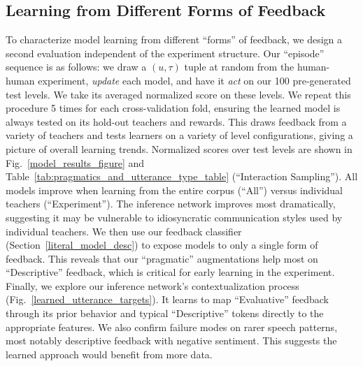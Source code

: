 \documentclass[letterpaper]{article} %
\begin{document}
\subsection{Learning from Different Forms of Feedback}
\label{random_sample_interactions}
\label{feedback_types}
To characterize model learning from different ``forms'' of feedback, we design a second evaluation independent of the experiment structure. Our ``episode'' sequence is as follows: we draw a $(u, \tau)$ tuple at random from the human-human experiment, \emph{update} each model, and have it \emph{act} on our 100 pre-generated test levels. We take its averaged normalized score on these levels. We repeat this procedure 5 times for each cross-validation fold, ensuring the learned model is always tested on its hold-out teachers and rewards. This draws feedback from a variety of teachers and tests learners on a variety of level configurations, giving a picture of overall learning trends. Normalized scores over test levels are shown in Fig.~\ref{model_results_figure} and Table~\ref{tab:pragmatics_and_utterance_type_table} (``Interaction Sampling''). All models improve when learning from the entire corpus (``All'') versus individual teachers (``Experiment''). The inference network improves most dramatically, suggesting it may be vulnerable to idiosyncratic communication styles used by individual teachers. We then use our feedback classifier (Section~\ref{literal_model_desc}) to expose models to only a single form of feedback. This reveals that our ``pragmatic'' augmentations help most on ``Descriptive'' feedback, which is critical for early learning in the experiment. Finally, we explore our inference network's contextualization process (Fig.~\ref{learned_utterance_targets}). It learns to map ``Evaluative'' feedback through its prior behavior and typical ``Descriptive'' tokens directly to the appropriate features. We also confirm failure modes on rarer speech patterns, most notably descriptive feedback with negative sentiment. This suggests the learned approach would benefit from more data.

\vspace{-0.77mm}
\end{document}
